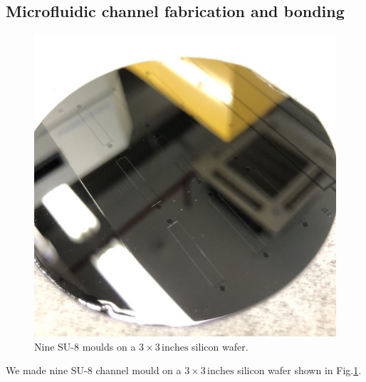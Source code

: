 \documentclass[journal,svgnames,twocolumn,x11names]{IEEEtran}
\begin{document}
\subsection{Microfluidic channel fabrication and bonding}
\begin{figure}[htp]
    \centering
    \includegraphics[scale = 0.18]{su8.jpg}
    \caption{Nine SU-8 moulds on a $3\times3\,\mathrm{inches}$ silicon wafer.}
    \label{fig:su8}
\end{figure}
We made nine SU-8 channel mould on a $3\times3\,\mathrm{inches}$ silicon wafer shown in Fig.\ref{fig:su8}.
\end{document}
